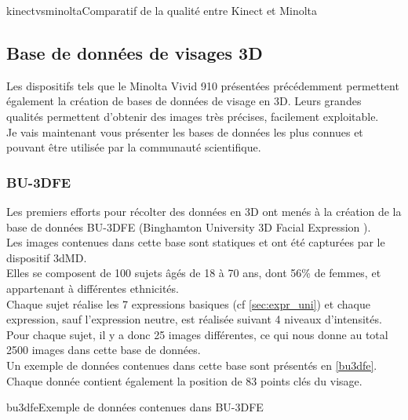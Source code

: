 \documentclass[overfullbox, poster]{polytech/polytech}
\begin{document}
\begin{Figure}{kinectvsminolta}{Comparatif de la qualité entre Kinect et Minolta}
\end{Figure}

\newpage
\subsection{Base de données de visages 3D}
\label{bdd3d}
Les dispositifs tels que le Minolta Vivid 910 présentées précédemment permettent également la création de bases de données de visage en 3D. Leurs grandes qualités permettent d'obtenir des images très précises, facilement exploitable.\\
Je vais maintenant vous présenter les bases de données les plus connues et pouvant être utilisée par la communauté scientifique.

\subsubsection{BU-3DFE}
Les premiers efforts pour récolter des données en 3D ont menés à la création de la base de données BU-3DFE (Binghamton University 3D Facial Expression \cite{bu3dfe_article}).\\
Les images contenues dans cette base sont statiques et ont été capturées par le dispositif 3dMD.\\
Elles se composent de 100 sujets âgés de 18 à 70 ans, dont 56\% de femmes, et appartenant à différentes ethnicités.\\
Chaque sujet réalise les 7 expressions basiques (cf \autoref{sec:expr_uni}) et chaque expression, sauf l'expression neutre, est réalisée suivant 4 niveaux d'intensités. Pour chaque sujet, il y a donc 25 images différentes, ce qui nous donne au total 2500 images dans cette base de données.\\
Un exemple de données contenues dans cette base sont présentés en \autoref{bu3dfe}.\\
Chaque donnée contient également la position de 83 points clés du visage.

\begin{Figure}{bu3dfe}{Exemple de données contenues dans BU-3DFE}
\end{Figure}
\end{document}
